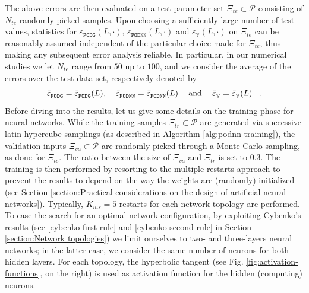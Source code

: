 \documentclass[12pt, a4paper, twoside, openright, notitlepage]{report}
\numberwithin{equation}{chapter}
\theoremstyle{theorem}
\theoremstyle{definition}
\theoremstyle{remark}
\theoremstyle{proposition}
\numberwithin{figure}{chapter}
\begin{document}
		The above errors are then evaluated on a test parameter set $\Xi_{te} \subset \mathcal{P}$ consisting of $N_{te}$ randomly picked samples. Upon choosing a sufficiently large number of test values, statistics for $\varepsilon_{\texttt{PODG}}^{}(L, \cdot)$, $\varepsilon_{\texttt{PODNN}}^{}(L, \cdot)$ and $\varepsilon_{\mathbb{V}}^{}(L, \cdot)$ on $\Xi_{te}$ can be reasonably assumed independent of the particular choice made for $\Xi_{te}$, thus making any subsequent error analysis reliable. In particular, in our numerical studies we let $N_{te}$ range from $50$ up to $100$, and we consider the average of the errors over the test data set, respectively denoted by
		\begin{equation*}
			\text{$\bar{\varepsilon}_{\texttt{PODG}}^{} = \bar{\varepsilon}_{\texttt{PODG}}^{}(L)$, \hspace*{0.2cm} $\bar{\varepsilon}_{\texttt{PODNN}}^{} = \bar{\varepsilon}_{\texttt{PODNN}}^{}(L)$ \hspace*{0.2cm} and \hspace*{0.2cm} $\bar{\varepsilon}_{\mathbb{V}}^{} = \bar{\varepsilon}_{\mathbb{V}}^{}(L)$ \, .}
		\end{equation*} 
		Before diving into the results, let us give some details on the training phase for neural networks. While the training samples $\Xi_{tr} \subset \mathcal{P}$ are generated via successive latin hypercube samplings (as described in Algorithm \ref{alg:podnn-training}), the validation inputs $\Xi_{va} \subset \mathcal{P}$ are randomly picked through a Monte Carlo sampling, as done for $\Xi_{te}$. The ratio between the size of $\Xi_{va}$ and $\Xi_{tr}$ is set to $0.3$. The training is then performed by resorting to the multiple restarts approach to prevent the results to depend on the way the weights are (randomly) initialized (see Section \ref{section:Practical considerations on the design of artificial neural networks}). Typically, $K_{ms} = 5$ restarts for each network topology are performed. To ease the search for an optimal network configuration, by exploiting Cybenko's results (see \ref{cybenko-first-rule} and \ref{cybenko-second-rule} in Section \ref{section:Network topologies}) we limit ourselves to two- and three-layers neural networks; in the latter case, we consider the same number of neurons for both hidden layers. For each topology, the hyperbolic tangent (see Fig. \ref{fig:activation-functions}, on the right) is used as activation function for the hidden (computing) neurons.  
		
\end{document}

